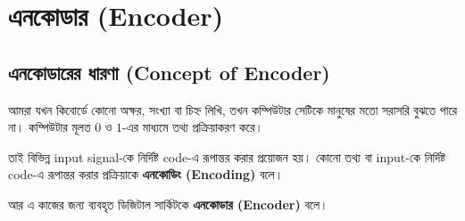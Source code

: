 
\section{এনকোডার
(\textenglish{Encoder})}


\subsection{এনকোডারের ধারণা
(\textenglish{Concept of Encoder})}

আমরা যখন কিবোর্ডে কোনো অক্ষর, সংখ্যা বা চিহ্ন লিখি,
তখন কম্পিউটার সেটিকে মানুষের মতো সরাসরি বুঝতে পারে না।
কম্পিউটার মূলত \(0\) ও \(1\)-এর মাধ্যমে তথ্য প্রক্রিয়াকরণ করে।

তাই বিভিন্ন \textenglish{input signal}-কে নির্দিষ্ট
\textenglish{code}-এ রূপান্তর করার প্রয়োজন হয়।
কোনো তথ্য বা \textenglish{input}-কে নির্দিষ্ট
\textenglish{code}-এ রূপান্তর করার প্রক্রিয়াকে
\textbf{এনকোডিং (\textenglish{Encoding})} বলে।

আর এ কাজের জন্য ব্যবহৃত ডিজিটাল সার্কিটকে
\textbf{এনকোডার (\textenglish{Encoder})} বলে।

\begin{center}
\begin{chThreeDiagram}
\end{chThreeDiagram}
\end{center}

